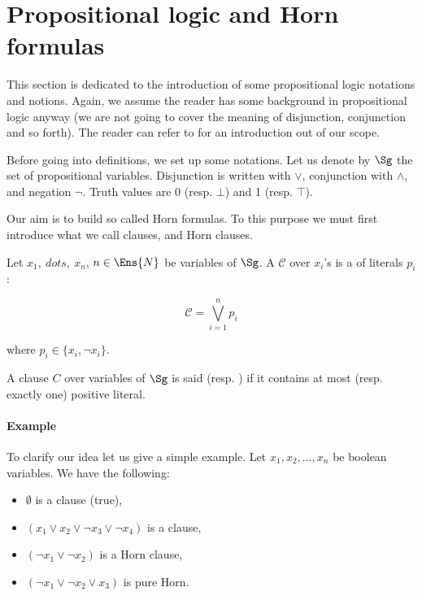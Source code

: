 \section{Propositional logic and Horn formulas}

This section is dedicated to the introduction of some propositional logic 
notations and notions. Again, we assume the reader has some background in
propositional logic anyway (we are not going to cover the meaning of 
disjunction, conjunction and so forth). The reader can refer to 
\cite{cori_mathematical_2000} for an introduction out of our scope.

\vspace{1.2em}

Before going into definitions, we set up some notations. Let us denote by
$\Sg$ the set of propositional variables. Disjunction is written with $\lor$,
conjunction with $\land$, and negation $\lnot$. Truth values are 0 (resp. 
$\bot$) and 1 (resp. $\top$).

Our aim is to build so called Horn formulas. To this purpose we must first 
introduce what we call clauses, and Horn clauses. 

\begin{definition}[clause] Let $x_1, \ dots, \ x_n$, $n \in \Ens{N}$
be variables of $\Sg$. A  $\mathcal{C}$ over $x_i$'s is a 
 of literals $p_i$:

	\[ \mathcal{C} = \bigvee_{i = 1}^{n} p_i \]

\noindent where $p_i \in \{x_i, \lnot x_i \}$.
\end{definition}

\begin{definition} A clause $C$ over variables of $\Sg$
is said  (resp. ) if it contains at most (resp. 
exactly one) positive literal.

\end{definition}

\paragraph{Example} To clarify our idea let us give a simple example. Let $x_1,
x_2, \dots, x_n$ be boolean variables. We have the following:
\begin{itemize}
	\item $\emptyset$ is a clause (true),
	\item $(x_1 \lor x_2 \lor \lnot x_3 \lor \lnot x_4)$ is a clause,
	\item $(\lnot x_1 \lor \lnot x_2)$ is a Horn clause,
	\item $(\lnot x_1 \lor \lnot x_2 \lor x_3)$ is pure Horn.
\end{itemize}


